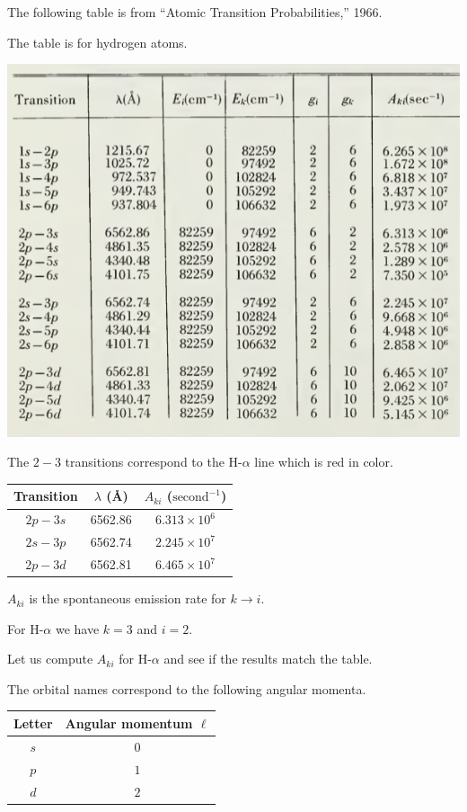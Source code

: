 \documentclass[12pt]{article}
\begin{document}
\noindent
The following table is from ``Atomic Transition Probabilities,'' 1966.

\bigskip
\noindent
The table is for hydrogen atoms.

\begin{center}
\includegraphics[scale=0.5]{h-alpha-line.png}
\end{center}

\noindent
The $2-3$ transitions correspond to the H-$\alpha$ line which is red in color.
\begin{center}
\begin{tabular}{|c|c|c|}
\hline
Transition & $\lambda$ (\AA) & $A_{ki}$ ($\text{second}^{-1}$)
\\
\hline
$2p-3s$ & 6562.86 & $6.313\times10^6$
\\
$2s-3p$ & 6562.74 & $2.245\times10^7$
\\
$2p-3d$ & 6562.81 & $6.465\times10^7$
\\
\hline
\end{tabular}
\end{center}

\noindent
$A_{ki}$ is the spontaneous emission rate for $k\rightarrow i$.

\bigskip
\noindent
For H-$\alpha$ we have $k=3$ and $i=2$.

\bigskip
\noindent
Let us compute $A_{ki}$ for H-$\alpha$ and see if the results match the table.

\bigskip
\noindent
The orbital names correspond to the following angular momenta.
\begin{center}
\begin{tabular}{|c|c|}
\hline
Letter & Angular momentum $\ell$
\\
\hline
$s$ & $0$
\\
$p$ & $1$
\\
$d$ & $2$
\\
\hline
\end{tabular}
\end{center}
\end{document}
